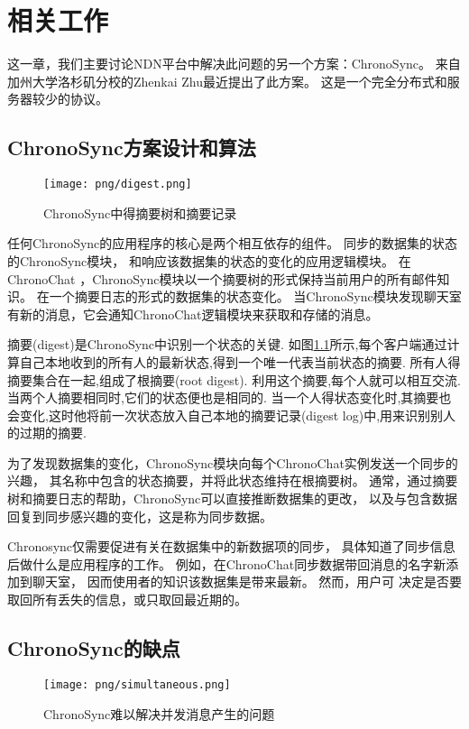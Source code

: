 \chapter{相关工作}
\label{chapter:relatedwork}



这一章，我们主要讨论NDN平台中解决此问题的另一个方案：ChronoSync。
来自加州大学洛杉矶分校的Zhenkai Zhu最近提出了此方案。
这是一个完全分布式和服务器较少的协议。

\section{ChronoSync方案设计和算法}

\begin{figure}
\centering
\texttt{[image: png/digest.png]}
\caption{ChronoSync中得摘要树和摘要记录}
\label{fig:digest}
\end{figure}

任何ChronoSync的应用程序的核心是两个相互依存的组件。
同步的数据集的状态的ChronoSync模块，
和响应该数据集的状态的变化的应用逻辑模块。
在ChronoChat ，ChronoSync模块以一个摘要树的形式保持当前用户的所有邮件知识。
在一个摘要日志的形式的数据集的状态变化。
当ChronoSync模块发现聊天室有新的消息，它会通知ChronoChat逻辑模块来获取和存储的消息。

摘要(digest)是ChronoSync中识别一个状态的关键.
如图\ref{fig:digest}所示,每个客户端通过计算自己本地收到的所有人的最新状态,得到一个唯一代表当前状态的摘要.
所有人得摘要集合在一起,组成了根摘要(root digest).
利用这个摘要,每个人就可以相互交流.
当两个人摘要相同时,它们的状态便也是相同的.
当一个人得状态变化时,其摘要也会变化,这时他将前一次状态放入自己本地的摘要记录(digest log)中,用来识别别人的过期的摘要.

为了发现数据集的变化，ChronoSync模块向每个ChronoChat实例发送一个同步的兴趣，
其名称中包含的状态摘要，并将此状态维持在根摘要树。
通常，通过摘要树和摘要日志的帮助，ChronoSync可以直接推断数据集的更改，
以及与包含数据回复到同步感兴趣的变化，这是称为同步数据。

Chronosync仅需要促进有关在数据集中的新数据项的同步，
具体知道了同步信息后做什么是应用程序的工作。
例如，在ChronoChat同步数据带回消息的名字新添加到聊天室，
因而使用者的知识该数据集是带来最新。
然而，用户可 决定是否要取回所有丢失的信息，或只取回最近期的。

\section{ChronoSync的缺点}
\begin{figure}
\centering
\texttt{[image: png/simultaneous.png]}
\caption{ChronoSync难以解决并发消息产生的问题}
\label{fig:chrono_simultaneous}
\end{figure}

